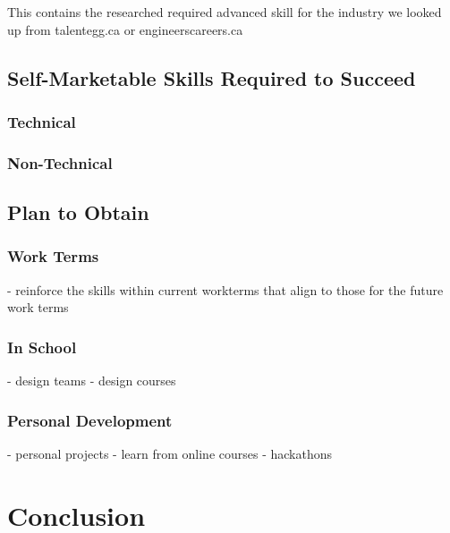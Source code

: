 \documentclass[10pt,letterpaper]{article}
\begin{document}


This contains the researched required advanced skill for the industry we looked up from talentegg.ca or engineerscareers.ca

\subsection{Self-Marketable Skills Required to Succeed}
\subsubsection{Technical}

\subsubsection{Non-Technical}

\subsection{Plan to Obtain}

\subsubsection{Work Terms}
- reinforce the skills within current workterms that align to those for the future work terms

\subsubsection{In School}
- design teams
- design courses

\subsubsection{Personal Development}
- personal projects
- learn from online courses
- hackathons

\clearpage
\section*{Conclusion}\label{conclusion}
\end{document}
